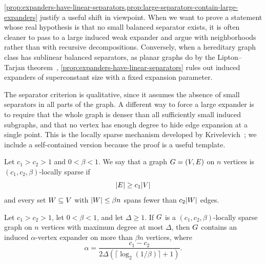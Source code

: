 \cref{prop:expanders-have-linear-separators,prop:large-separators-contain-large-expanders} justify a useful shift in viewpoint. When we want to prove a statement whose real hypothesis is that no small balanced separator exists, it is often cleaner to pass to a large induced weak expander and argue with neighborhoods rather than with recursive decompositions. Conversely, when a hereditary graph class has sublinear balanced separators, as planar graphs do by the Lipton--Tarjan theorem~\cite{LT1979}, \cref{prop:expanders-have-linear-separators} rules out induced expanders of superconstant size with a fixed expansion parameter.

The separator criterion is qualitative, since it assumes the absence of small separators in all parts of the graph. A different way to force a large expander is to require that the whole graph is denser than all sufficiently small induced subgraphs, and that no vertex has enough degree to hide edge expansion at a single point. This is the locally sparse mechanism developed by Krivelevich~\cite{Kri2017}; we include a self-contained version because the proof is a useful template.

\begin{definition}
	\label{def:locally-sparse-graph}
	Let \(c_1>c_2>1\) and \(0<\beta<1\). We say that a graph \(G=(V,E)\) on \(n\) vertices is \((c_1,c_2,\beta)\)-locally sparse if
	\begin{equation}
		\label{eq:locally-sparse-global-density}
		\lvert E\rvert\geq c_1\lvert V\rvert
	\end{equation}
	and every set \(W\subseteq V\) with \(\lvert W\rvert\leq \beta n\) spans fewer than \(c_2\lvert W\rvert\) edges.
\end{definition}

\begin{theorem}
	\label{thm:locally-sparse-graphs-contain-expanders}
	Let \(c_1>c_2>1\), let \(0<\beta<1\), and let \(\Delta\geq 1\). If \(G\) is a \((c_1,c_2,\beta)\)-locally sparse graph on \(n\) vertices with maximum degree at most \(\Delta\), then \(G\) contains an induced \(\alpha\)-vertex expander on more than \(\beta n\) vertices, where
	\begin{equation}
		\label{eq:locally-sparse-alpha}
		\alpha=\frac{c_1-c_2}{2\Delta(\lceil \log_2(1/\beta)\rceil+1)}.
	\end{equation}
\end{theorem}


